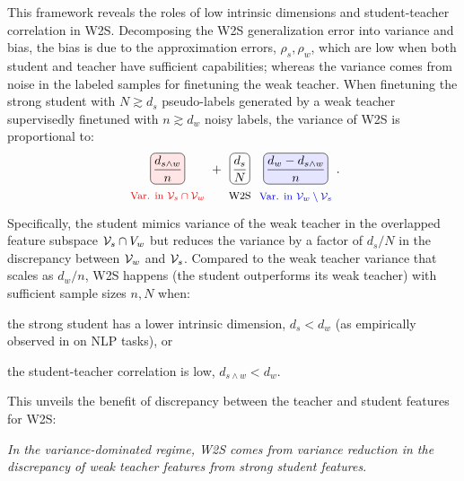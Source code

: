 This framework reveals the roles of low intrinsic dimensions and student-teacher correlation in W2S.
Decomposing the W2S generalization error into variance and bias, the bias is due to the approximation errors, $\rho_s, \rho_w$, which are low when both student and teacher have sufficient capabilities; whereas the variance comes from noise in the labeled samples for finetuning the weak teacher.
When finetuning the strong student with $N \gtrsim d_s$ pseudo-labels generated by a weak teacher supervisedly finetuned with $n \gtrsim d_w$ noisy labels, the variance of W2S is proportional to:
\begin{align*}
    \tikz[baseline=(A.base)]{
    \node[fill=red!10, draw, rounded corners, inner sep=2pt] (A)
       {$\displaystyle \frac{d_{s \wedge w}}{n}$};
    \node[below=15pt, anchor=north] {\footnotesize \red{Var. in $\Vcal_s \cap \Vcal_w$}};
    }
    + 
    \tikz[baseline=(A.base)]{
    \node[draw, rounded corners, inner sep=2pt] (A)
       {$\displaystyle \frac{d_s}{N}$};
    \node[below=15pt, anchor=north] {\footnotesize W2S};
    }
    \tikz[baseline=(B.base)]{
    \node[fill=blue!10, draw, rounded corners, inner sep=2pt] (B)
       {$\displaystyle \frac{d_w - d_{s \wedge w}}{n}$}; 
    \node[below=15pt, anchor=north] {\footnotesize\blue{Var. in $\Vcal_w \setminus \Vcal_s$}};
    }.
\end{align*}
Specifically, the student mimics variance of the weak teacher in the overlapped feature subspace $\mathcal{V}_s \cap V_w$ but reduces the variance by a factor of $d_s/N$ in the discrepancy between $\mathcal{V}_w$ and $\mathcal{V}_s$.
Compared to the weak teacher variance that scales as $d_w/n$, W2S happens (\ie the student outperforms its weak teacher) with sufficient sample sizes $n, N$ when:
\begin{enumerate*}[label=(\roman*)]
    \item the strong student has a lower intrinsic dimension, $d_s < d_w$ (as empirically observed in \cite{aghajanyan2020intrinsic} on NLP tasks), or
    \item the student-teacher correlation is low, $d_{s \wedge w} < d_w$.
\end{enumerate*}
This unveils the benefit of discrepancy between the teacher and student features for W2S: 
\begin{center}
    \emph{In the variance-dominated regime, W2S comes from variance reduction in the discrepancy of weak teacher features from strong student features}.
\end{center}



